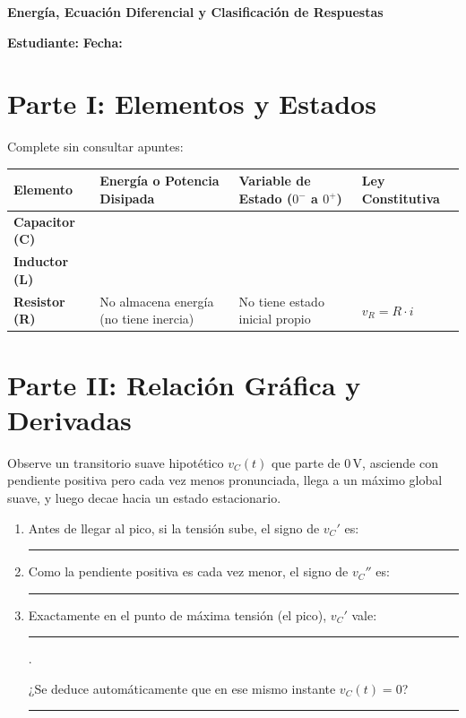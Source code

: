 \documentclass[11pt, a4paper]{article}
\begin{document}
\begin{tcolorbox}[colback=ucbblue!5!white, colframe=ucbblue, title=\textbf{Hoja de Trabajo: Fundamentos de Segundo Orden RLC}]
    \centering \textbf{Energía, Ecuación Diferencial y Clasificación de Respuestas}
\end{tcolorbox}

\textbf{Estudiante:} \hrulefill \quad \textbf{Fecha:} \hrulefill

\vspace{0.4cm}
\section*{Parte I: Elementos y Estados}
Complete sin consultar apuntes:

\vspace{0.2cm}
\renewcommand{\arraystretch}{1.8}
\noindent
\begin{tabularx}{\textwidth}{>{\bfseries\RaggedRight}p{2.8cm} >{\RaggedRight\arraybackslash}X >{\RaggedRight\arraybackslash}X >{\RaggedRight\arraybackslash}X}
\toprule
\textbf{Elemento} & \textbf{Energía o Potencia Disipada} & \textbf{Variable de Estado ($0^-$ a $0^+$)} & \textbf{Ley Constitutiva} \\ 
\midrule
Capacitor (C) & \vspace{0.6cm} & & \\ \addlinespace
Inductor (L)  & \vspace{0.6cm} & & \\ \addlinespace
Resistor (R)  & No almacena energía (no tiene inercia) & No tiene estado inicial propio & $v_R = R \cdot i$ \\ 
\bottomrule
\end{tabularx}

\vspace{0.4cm}
\section*{Parte II: Relación Gráfica y Derivadas}
Observe un transitorio suave hipotético $v_C(t)$ que parte de $0\,\text{V}$, asciende con pendiente positiva pero cada vez menos pronunciada, llega a un máximo global suave, y luego decae hacia un estado estacionario.
\begin{enumerate}
    \item Antes de llegar al pico, si la tensión sube, el signo de $v_C'$ es: \rule{2cm}{0.4pt}
    \item Como la pendiente positiva es cada vez menor, el signo de $v_C''$ es: \rule{2cm}{0.4pt}
    \item Exactamente en el punto de máxima tensión (el pico), $v_C'$ vale: \rule{2cm}{0.4pt}. \par
    \vspace{0.1cm}
    ¿Se deduce automáticamente que en ese mismo instante $v_C(t) = 0$? \rule{2cm}{0.4pt}
\end{enumerate}
\end{document}
